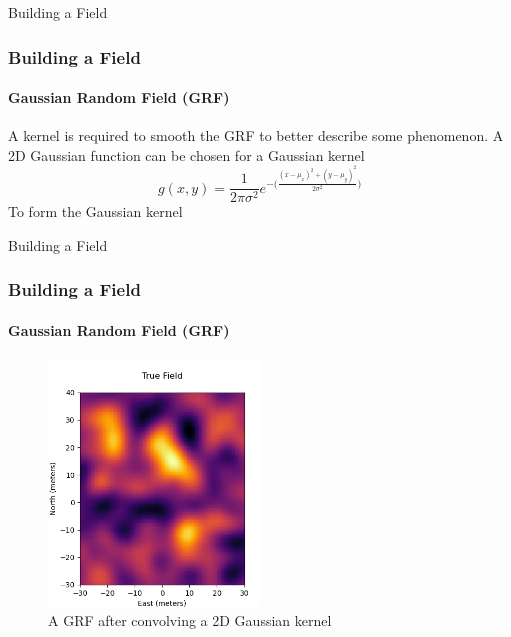 \documentclass[professionalfont,10pt]{beamer}
\begin{document}
	\begin{frame}[t]{Building a Field}
		\frametitle{Building a Field}
		\framesubtitle{Gaussian Random Field (GRF)}
		\hskip-0.75cm
		\begin{minipage}[t]{0.2\linewidth}\vspace{-0.5cm}
			\tiny\tableofcontents[currentsection,currentsubsection,hideothersubsections,subsectionstyle=show/shaded]
		\end{minipage}
		\hfill%
		\begin{minipage}[t]{0.86\linewidth}\vspace{-0.5cm}
			\begin{flushleft}
				A kernel is required to smooth the GRF to better describe some phenomenon. A 2D Gaussian function can be chosen for a Gaussian kernel
				\begin{equation}
					g(x, y) = \frac{1}{2\pi\sigma^2}e^{-\bigg(\frac{(x-\mu_x)^2 + (y-\mu_y)^2}{2\sigma^2}\bigg)}
				\end{equation}
				To form the Gaussian kernel
				\begin{equation}
					
				\end{equation}
			\end{flushleft}
		\end{minipage}
		\vfill%
		
	\end{frame}
	
	\begin{frame}[t]{Building a Field}
		\frametitle{Building a Field}
		\framesubtitle{Gaussian Random Field (GRF)}
		\hskip-0.75cm
		\begin{minipage}[t]{0.2\linewidth}\vspace{-0.5cm}
			\tiny\tableofcontents[currentsection,currentsubsection,hideothersubsections,subsectionstyle=show/shaded]
		\end{minipage}
		\hfill%
		\begin{minipage}[t]{0.86\linewidth}\vspace{-0.5cm}
			\begin{figure}[t]
				\centering
				\captionsetup{width=0.9\textwidth}
				\includegraphics[width=0.5\textwidth]{../images/GRFafterConv.png}
				\caption{A GRF after convolving a 2D Gaussian kernel}
				\label{CFandEncoder}
			\end{figure}
		\end{minipage}
		\vfill%
		
	\end{frame}
\end{document}
